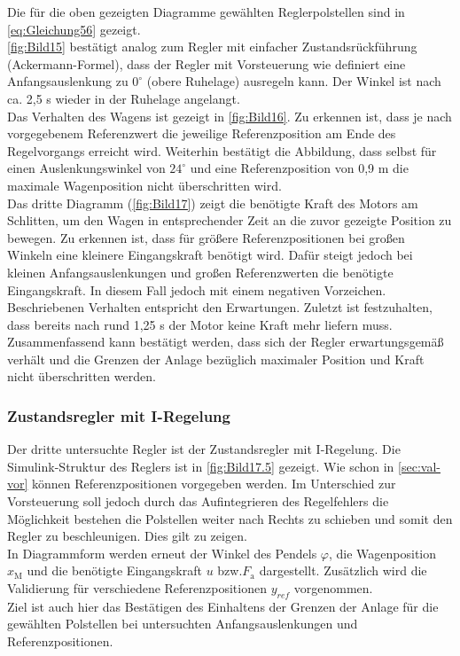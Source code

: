 \documentclass[
	pagesize,
	fontsize=12pt,
	paper=a4,
	oneside,
   reqno
]{scrartcl}
\newcommand{\bzw}{bzw.\xspace}
\newcommand{\ca}{ca.\xspace}
\begin{document}
\newpage
Die für die oben gezeigten Diagramme gewählten Reglerpolstellen sind in \autoref{eq:Gleichung56} gezeigt. \\
\newline
\autoref{fig:Bild15} bestätigt analog zum Regler mit einfacher Zustandsrückführung (Ackermann-Formel), dass der Regler mit Vorsteuerung wie definiert eine Anfangsauslenkung zu $0^\circ$ (obere Ruhelage) ausregeln kann. Der Winkel ist nach \ca 2,5 s wieder in der Ruhelage angelangt. \\
\newline
Das Verhalten des Wagens ist gezeigt in \autoref{fig:Bild16}. Zu erkennen ist, dass je nach vorgegebenem Referenzwert die jeweilige Referenzposition am Ende des Regelvorgangs erreicht wird. Weiterhin bestätigt die Abbildung, dass selbst für einen Auslenkungswinkel von $24^\circ$ und eine Referenzposition von 0,9 m die maximale Wagenposition nicht überschritten wird. \\
\newline
Das dritte Diagramm (\autoref{fig:Bild17}) zeigt die benötigte Kraft des Motors am Schlitten, um den Wagen in entsprechender Zeit an die zuvor gezeigte Position zu bewegen. Zu erkennen ist, dass für größere Referenzpositionen bei großen Winkeln eine kleinere Eingangskraft benötigt wird. Dafür steigt jedoch bei kleinen Anfangsauslenkungen und großen Referenzwerten die benötigte Eingangskraft. In diesem Fall jedoch mit einem negativen Vorzeichen. Beschriebenen Verhalten entspricht den Erwartungen. Zuletzt ist festzuhalten, dass bereits nach rund 1,25 s der Motor keine Kraft mehr liefern muss.\\
\newline
Zusammenfassend kann bestätigt werden, dass sich der Regler erwartungsgemäß verhält und die Grenzen der Anlage bezüglich maximaler Position und Kraft nicht überschritten werden.

\subsubsection{Zustandsregler mit I-Regelung}

Der dritte untersuchte Regler ist der Zustandsregler mit I-Regelung. Die Simulink-Struktur des Reglers ist in \autoref{fig:Bild17.5} gezeigt. Wie schon in \autoref{sec:val-vor} können Referenzpositionen vorgegeben werden. Im Unterschied zur Vorsteuerung soll jedoch durch das Aufintegrieren des Regelfehlers die Möglichkeit bestehen die Polstellen weiter nach Rechts zu schieben und somit den Regler zu beschleunigen. Dies gilt zu zeigen. \\
In Diagrammform werden erneut der Winkel des Pendels $\varphi$, die Wagenposition $x_{\mathrm{M}}$ und die benötigte Eingangskraft $u$ \bzw $F_{\mathrm{a}}$ dargestellt. Zusätzlich wird die Validierung für verschiedene Referenzpositionen $y_{ref}$ vorgenommen. \\
Ziel ist auch hier das Bestätigen des Einhaltens der Grenzen der Anlage für die gewählten Polstellen bei untersuchten Anfangsauslenkungen und Referenzpositionen. 
\end{document}
